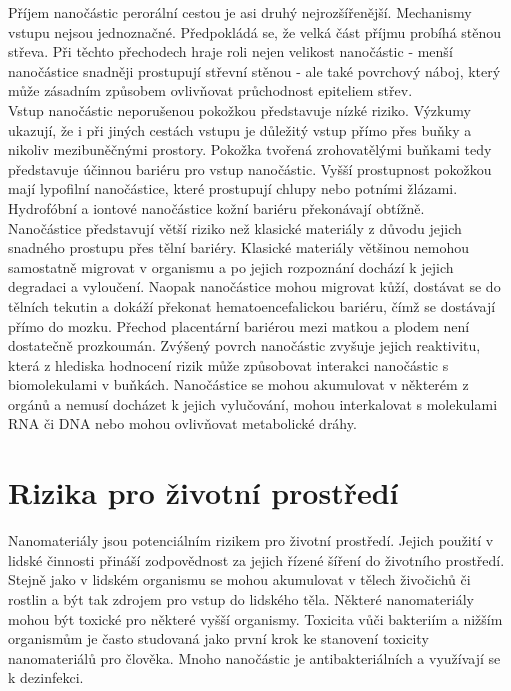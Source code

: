 Příjem nanočástic perorální cestou je asi druhý nejrozšířenější. Mechanismy vstupu nejsou jednoznačné. Předpokládá se, že velká část příjmu probíhá stěnou střeva. Při těchto přechodech hraje roli nejen velikost nanočástic - menší nanočástice snadněji prostupují střevní stěnou - ale také povrchový náboj, který může zásadním způsobem ovlivňovat průchodnost epiteliem střev. \cite{filipova2012}\\

Vstup nanočástic neporušenou pokožkou představuje nízké riziko. Výzkumy ukazují, že i při jiných cestách vstupu je důležitý vstup přímo přes buňky a nikoliv mezibuněčnými prostory. Pokožka tvořená zrohovatělými buňkami tedy představuje účinnou bariéru pro vstup nanočástic. Vyšší prostupnost pokožkou mají lypofilní nanočástice, které prostupují chlupy nebo potními žlázami. Hydrofóbní a iontové nanočástice kožní bariéru překonávají obtížně. \cite{filipova2012} \\

Nanočástice představují větší riziko než klasické materiály z důvodu jejich snadného prostupu přes tělní bariéry. Klasické materiály většinou nemohou samostatně migrovat v organismu a po jejich rozpoznání dochází k jejich degradaci a vyloučení. Naopak nanočástice mohou migrovat kůží, dostávat se do tělních tekutin a dokáží překonat hematoencefalickou bariéru, čímž se dostávají přímo do mozku. Přechod placentární bariérou mezi matkou a plodem není dostatečně prozkoumán. Zvýšený povrch nanočástic zvyšuje jejich reaktivitu, která z hlediska hodnocení rizik může způsobovat interakci nanočástic s biomolekulami v buňkách. Nanočástice se mohou akumulovat v některém z orgánů a nemusí docházet k jejich vylučování, mohou interkalovat s molekulami RNA či DNA nebo mohou ovlivňovat metabolické dráhy.\\

\section{Rizika pro životní prostředí}

Nanomateriály jsou potenciálním rizikem pro životní prostředí. Jejich použití v lidské činnosti přináší zodpovědnost za jejich řízené šíření do životního prostředí. Stejně jako v lidském organismu se mohou akumulovat v tělech živočichů či rostlin a být tak zdrojem pro vstup do lidského těla. Některé nanomateriály mohou být toxické pro některé vyšší organismy. Toxicita vůči bakteriím a nižším organismům je často studovaná jako první krok ke stanovení toxicity nanomateriálů pro člověka. Mnoho nanočástic je antibakteriálních a využívají se k dezinfekci. \\

